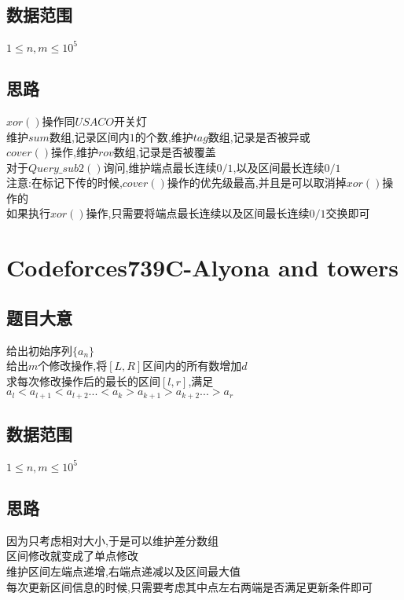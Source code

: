\documentclass{ctexart}
\numberwithin{equation}{section}
\begin{document}
\begin{flushleft}
  \subsection{数据范围}
  $1\le n,m\le 10^5$ \\
  \subsection{思路}
  $xor()$操作同$USACO$开关灯 \\
  维护$sum$数组,记录区间内$1$的个数,维护$tag$数组,记录是否被异或 \\
  $cover()$操作,维护$rov$数组,记录是否被覆盖 \\
  对于$Query\_sub2()$询问,维护端点最长连续$0/1$,以及区间最长连续$0/1$ \\
  注意:在标记下传的时候,$cover()$操作的优先级最高,并且是可以取消掉$xor()$操作的 \\
  如果执行$xor()$操作,只需要将端点最长连续以及区间最长连续$0/1$交换即可 \\
  \newpage

  \section{Codeforces739C-Alyona and towers}
  \subsection{题目大意}
  给出初始序列$\{a_n\}$ \\
  给出$m$个修改操作,将$[L,R]$区间内的所有数增加$d$ \\
  求每次修改操作后的最长的区间$[l,r]$,满足$a_l<a_{l+1}<a_{l+2}...<a_k>a_{k+1}>a_{k+2}...>a_r$ \\
  \subsection{数据范围}
  $1\le n,m\le 10^5$ \\
  \subsection{思路}
  因为只考虑相对大小,于是可以维护差分数组 \\
  区间修改就变成了单点修改 \\
  维护区间左端点递增,右端点递减以及区间最大值 \\
  每次更新区间信息的时候,只需要考虑其中点左右两端是否满足更新条件即可 \\
  \newpage


\end{flushleft}
\end{document}
